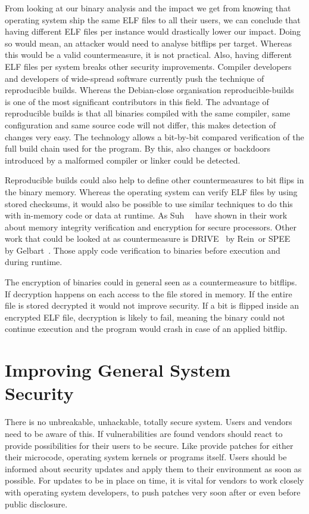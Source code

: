 From looking at our binary analysis and the impact we get from knowing that
operating system ship the same ELF files to all their users, we can conclude
that having different ELF files per instance would drastically lower our impact.
Doing so would mean, an attacker would need to analyse bitflips per target.
Whereas this would be a valid countermeasure, it is not practical. Also, having
different ELF files per system breaks other security improvements. Compiler
developers and developers of wide-spread software currently push the technique
of reproducible builds. Whereas the Debian-close organisation
reproducible-builds~\cite{reprobuilds} is one of the most significant
contributors in this field. The advantage of reproducible builds is that all
binaries compiled with the same compiler, same configuration and same
source code will not differ, this makes detection of changes very easy. The
technology allows a bit-by-bit compared verification of the full build chain
used for the program. By this, also changes or backdoors introduced by a
malformed compiler or linker could be detected.

Reproducible builds could also help to define other countermeasures to bit flips
in the binary memory. Whereas the operating system can verify ELF files by using
stored checksums, it would also be possible to use similar techniques to do this
with in-memory code or data at runtime. As Suh~\etal~\cite{memintegrity} have
shown in their work about memory integrity verification and encryption for
secure processors. Other work that could be looked at as countermeasure is
DRIVE~\cite{drive} by Rein~\etal or SPEE~\cite{spee} by Gelbart~\etal. Those apply
code verification to binaries before execution and during runtime.

The encryption of binaries could in general seen as a countermeasure to
bitflips. If decryption happens on each access to the file stored in memory. If
the entire file is stored decrypted it would not improve security. If a bit is
flipped inside an encrypted ELF file, decryption is likely to fail, meaning the
binary could not continue execution and the program would crash in case of an
applied bitflip.

\section{Improving General System Security}

There is no unbreakable, unhackable, totally secure system. Users and vendors
need to be aware of this. If vulnerabilities are found vendors should react to
provide possibilities for their users to be secure. Like provide patches for
either their microcode, operating system kernels or programs itself. Users
should be informed about security updates and apply them to their environment
as soon as possible. For updates to be in place on time, it is vital for
vendors to work closely with operating system developers, to push patches very
soon after or even before public disclosure.


